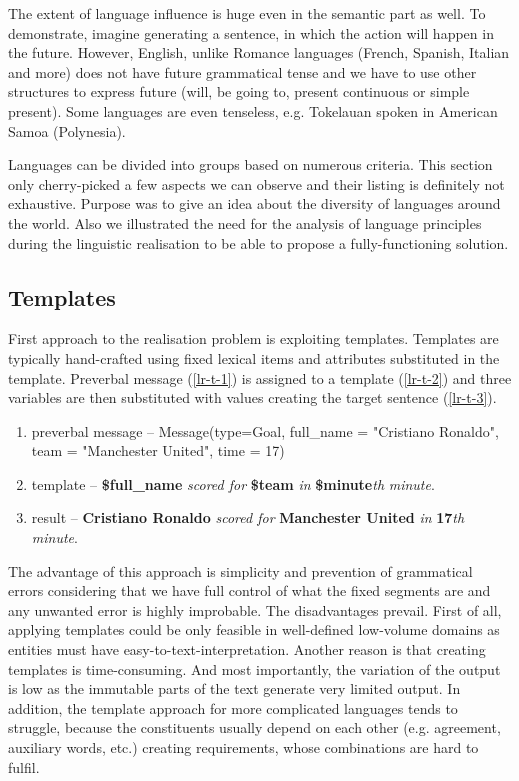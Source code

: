The extent of language influence is huge even in the semantic part as well. To demonstrate, imagine generating a sentence, in which the action will happen in the future. However, English, unlike Romance languages (French, Spanish, Italian and more) does not have future grammatical tense and we have to use other structures to express future (will, be going to, present continuous or simple present). Some languages are even tenseless, e.g. Tokelauan spoken in American Samoa (Polynesia).

Languages can be divided into groups based on numerous criteria. This section only cherry-picked a few aspects we can observe and their listing is definitely not exhaustive. Purpose was to give an idea about the diversity of languages around the world. Also we illustrated the need for the analysis of language principles during the linguistic realisation to be able to propose a fully-functioning solution.  

\subsection{Templates}
First approach to the realisation problem is exploiting templates. Templates are typically hand-crafted using fixed lexical items and attributes substituted in the template. Preverbal message (\ref{lr-t-1}) is assigned to a template (\ref{lr-t-2}) and three variables are then substituted with values creating the target sentence (\ref{lr-t-3}). 

\begin{enumerate}[resume]
	\item preverbal message -- Message(type=Goal, full\_name = "Cristiano Ronaldo", team = "Manchester United", time = 17) \label{lr-t-1}
	\item template -- \textbf{\$full\_name} \emph{scored for} \textbf{\$team} \emph{in} \textbf{\$minute}\emph{th} \emph{minute}. \label{lr-t-2}
	\item result -- \textbf{Cristiano Ronaldo} \emph{scored for} \textbf{Manchester United} \emph{in} \textbf{17}\emph{th} \emph{minute}. \label{lr-t-3}
\end{enumerate}

The advantage of this approach is simplicity and prevention of grammatical errors considering that we have full control of what the fixed segments are and any unwanted error is highly improbable. The disadvantages prevail. First of all, applying templates could be only feasible in well-defined low-volume domains as entities must have easy-to-text-interpretation. Another reason is that creating templates is time-consuming. And most importantly, the variation of the output is low as the immutable parts of the text generate very limited output. In addition, the template approach for more complicated languages tends to struggle, because the constituents usually depend on each other (e.g. agreement, auxiliary words, etc.) creating requirements, whose combinations are hard to fulfil. 

